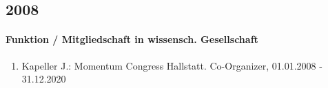 \subsection*{2008} 
\paragraph{Funktion / Mitgliedschaft in wissensch. Gesellschaft} 
\begin{enumerate}[leftmargin=*, labelsep=0.5cm] 
 	 \item Kapeller J.: Momentum Congress Hallstatt. Co-Organizer, 01.01.2008 - 31.12.2020 
\end{enumerate} 
